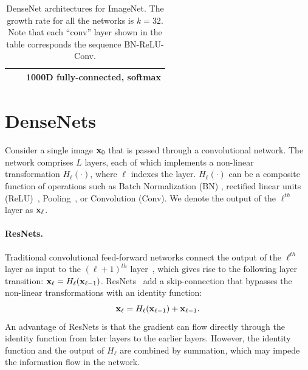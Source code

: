 \begin{table}[!t]
{\begin{tabular}{c|c|c|l|l|l}
                                                                                &                 & \multicolumn{4}{c}{1000D fully-connected, softmax}                                                                                                                                                                                                                                                                                                                                                                                               \\ \hline
\end{tabular}
}
\vspace{1 ex}
\caption{DenseNet architectures for ImageNet. The growth rate for all the networks is $k=32$. Note that each ``conv'' layer shown in the table corresponds the sequence BN-ReLU-Conv.   }
\label{densenet-imagenet}
\vspace{-3 ex}
\end{table}





\section{DenseNets}

Consider a single image $\mathbf{x}_0$ that is passed through a convolutional network. The network comprises $L$ layers, each of which implements a non-linear transformation $H_\ell(\cdot)$, where $\ell$ indexes the layer. $H_\ell(\cdot)$ can be a composite function of operations such as Batch Normalization (BN) \cite{batch-norm}, rectified linear units (ReLU)~\cite{relu}, Pooling~\cite{lenet5}, or  Convolution (Conv).
We denote the output of the $\ell^{th}$ layer as $\mathbf{x}_{\ell}$.


\vspace{-2 ex}
\paragraph{ResNets.}
Traditional convolutional feed-forward networks connect the output of the $\ell^{th}$ layer as input to the $(\ell+1)^{th}$ layer~\cite{alexnet}, which gives rise to the following layer transition: $\mathbf{x}_\ell=H_\ell(\mathbf{x}_{\ell-1})$. ResNets~\cite{resnet} add a skip-connection that bypasses the non-linear transformations with an identity function:
\vspace{-1ex}
\begin{equation}
\vspace{-1ex}
\bx_\ell=H_\ell(\bx_{\ell-1})+\bx_{\ell-1}\label{eq:resnet}.
\end{equation}
An advantage of ResNets is that the gradient can flow directly through the identity function from later layers to the earlier layers. However, the identity function and the output of $H_\ell$ are combined by summation, which may impede the information flow in the network.

